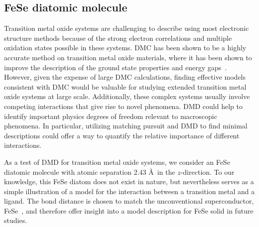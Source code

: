 \subsection{FeSe diatomic molecule}
\label{subsection:fese}
Transition metal oxide systems are challenging to describe using most electronic structure methods because of the strong electron correlations and multiple oxidation states possible in these systems. %
DMC has been shown to be a highly accurate method on transition metal oxide materials, where it has been shown to improve the description of the ground state properties and energy gaps~\cite{Foyevtsova2014, Wagner_Abbamonte, Zheng2015, Wagner2016}. %
However, given the expense of large DMC calculations, finding effective models consistent with DMC would be valuable for studying extended transition metal oxide systems at large scale.
Additionally, these complex systems usually involve competing interactions that give rise to novel phenomena. 
DMD could help to identify important physics degrees of freedom relevant to macroscopic phenomena.
In particular, utilizing matching pursuit  and DMD to find minimal descriptions could offer a way to quantify the relative importance of different interactions.

As a test of DMD for transition metal oxide systems, we consider an FeSe diatomic molecule with atomic separation 2.43 \AA~in the $z$-direction.
To our knowledge, this FeSe diatom does not exist in nature, but nevertheless serves as a simple illustration of a model for the interaction between a transition metal and a ligand. 
The bond distance is chosen to match the unconventional superconductor, FeSe~\cite{kumar_crystal_2010}, and therefore offer insight into a model description for FeSe solid in future studies.

